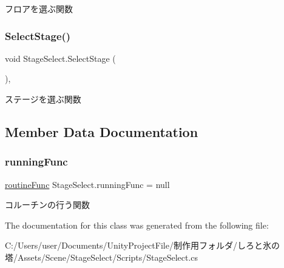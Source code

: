 フロアを選ぶ関数 

\mbox{\label{class_stage_select_a81b600e66141ab90bd9f48dc5f737db0}} 
\subsubsection{\texorpdfstring{Select\+Stage()}{SelectStage()}}
{\footnotesize\ttfamily void Stage\+Select.\+Select\+Stage (\begin{DoxyParamCaption}{ }\end{DoxyParamCaption})\hspace{0.3cm}{\ttfamily [inline]}, {\ttfamily [private]}}



ステージを選ぶ関数 



\subsection{Member Data Documentation}
\mbox{\label{class_stage_select_aad154f2d7ed55fde9d3b115f60f1f9e1}} 
\subsubsection{\texorpdfstring{running\+Func}{runningFunc}}
{\footnotesize\ttfamily \hyperlink{class_stage_select_a6b3980abcd91e390c76fc5f914554bbe}{routine\+Func} Stage\+Select.\+running\+Func = null\hspace{0.3cm}{\ttfamily [private]}}



コルーチンの行う関数 



The documentation for this class was generated from the following file\+:\begin{DoxyCompactItemize}
\item 
C\+:/\+Users/user/\+Documents/\+Unity\+Project\+File/制作用フォルダ/しろと氷の塔/\+Assets/\+Scene/\+Stage\+Select/\+Scripts/Stage\+Select.\+cs\end{DoxyCompactItemize}
